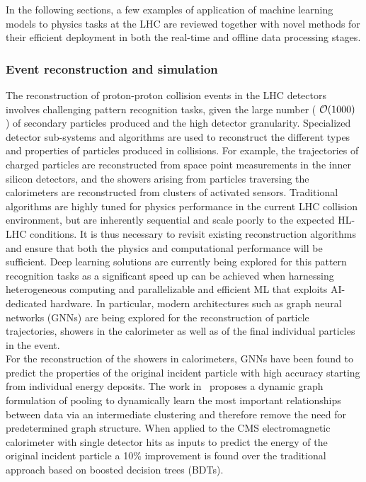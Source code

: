 In the following sections, a few examples of application of machine learning models to physics tasks at the LHC are reviewed together with novel methods for their efficient deployment in both the real-time and offline data processing stages.

\subsubsection{Event reconstruction and simulation}
\label{sec:lhceventreco}

The reconstruction of proton-proton collision events in the LHC detectors involves challenging pattern recognition tasks, given the large number ( ${\cal O}(1000)$ ) of secondary particles produced and the high detector granularity. Specialized detector sub-systems and algorithms are used to reconstruct the different types and properties of particles produced in collisions. For example, the trajectories of charged particles are reconstructed from space point measurements in the inner silicon detectors, and the showers arising from particles traversing the calorimeters are reconstructed from clusters of activated sensors. Traditional algorithms are highly tuned for physics performance in the current LHC collision environment, but are inherently sequential and scale poorly to the expected HL-LHC conditions. It is thus necessary to revisit existing reconstruction algorithms and ensure that both the physics and computational performance will be sufficient. Deep learning solutions are currently being explored for this pattern recognition tasks as a significant speed up can be achieved when harnessing heterogeneous computing and parallelizable and efficient ML that exploits AI-dedicated hardware. In particular, modern architectures such as graph neural networks (GNNs) are being explored for the reconstruction of particle trajectories, showers in the calorimeter as well as of the final individual particles in the event.\\

For the reconstruction of the showers in calorimeters, GNNs have been found to predict the properties of the original incident particle with high accuracy starting from individual energy deposits.
The work in~\cite{Gray:2020mcm} proposes a dynamic graph formulation of pooling to dynamically learn the most important relationships between data via an intermediate clustering and therefore remove the need for predetermined graph structure. When applied to the CMS electromagnetic calorimeter with single detector hits as inputs to predict the energy of the original incident particle a 10\% improvement is found over the traditional approach based on boosted decision trees (BDTs).

